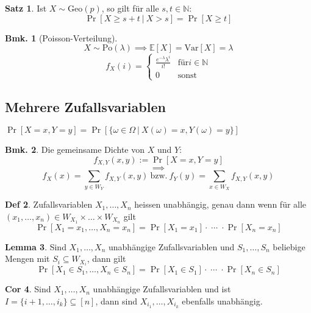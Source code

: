 \documentclass[a4paper, 10pt]{article}
\theoremstyle{definition}
\newtheorem{definition}{Def}[section]
\newtheorem{theorem}[definition]{Satz}
\newtheorem{nlemma}[definition]{Lemma}
\newtheorem{ncorollary}[definition]{Cor}
\newtheorem*{note}{Bmk.}
\theoremstyle{named}
\newcommand{\N}{\mathbb{N}}
\newcommand{\E}{\mathbb{E}}
\newcommand{\Var}{\text{Var}}
\begin{document}
\setcounter{definition}{44}
\begin{theorem}
    Ist $X \sim \text{Geo}(p)$, so gilt für alle $s, t \in \N$:
    $$\Pr[X \geq s + t \ | \ X > s] = \Pr[X \geq t]$$
\end{theorem}

\begin{note}[Poisson-Verteilung]
    $$X \sim \text{Po}(\lambda) \implies \E[X] = \Var[X] = \lambda$$
    $$f_X(i) = \begin{cases}
        \frac{e^{-\lambda} \lambda^i}{i!} & \text{für} i \in \N \\
        0 & \text{sonst}
    \end{cases}$$
\end{note}

\subsection{Mehrere Zufallsvariablen}
$\Pr[X = x, Y = y] = \Pr[\{\omega \in \Omega \ | \ X(\omega) = x, Y(\omega) = y\}]$

\begin{note}
    Die gemeinsame Dichte von $X$ und $Y$:
    $$f_{X, Y}(x, y) := \Pr[X = x, Y = y]$$
    $$\implies$$
    $$f_X(x) = \sum_{y \in W_Y} f_{X, Y}(x, y) \ \text{bzw.} \ f_Y(y) = \sum_{x \in W_X} f_{X, Y}(x, y)$$
\end{note}

\setcounter{definition}{51}
\begin{definition}
    Zufallsvariablen $X_1, \ldots, X_n$ heissen unabhängig, genau dann wenn für alle $(x_1, \ldots, x_n) \in W_{X_1} \times \ldots \times W_{X_n}$ gilt
    $$\Pr[X_1 = x_1, \ldots , X_n = x_n] = \Pr[X_1 = x_1] \cdot \; \cdots \; \cdot \Pr[X_n = x_n]$$
\end{definition}

\begin{nlemma}
    Sind $X_1, \ldots, X_n$ unabhängige Zufallsvariablen und $S_1, \ldots, S_n$ beliebige Mengen mit $S_i \subseteq W_{X_i}$, dann gilt
    $$\Pr[X_1 \in S_1, \ldots, X_n \in S_n] = \Pr[X_1 \in S_1] \cdot \; \cdots \; \cdot \Pr[X_n \in S_n]$$
\end{nlemma}

\begin{ncorollary}
    Sind $X_1, \ldots, X_n$ unabhängige Zufallsvariablen und ist $I = \{i+1, \ldots, i_k\} \subseteq [n]$, dann sind $X_{i_1}, \ldots, X_{i_k}$ ebenfalls unabhängig.
\end{ncorollary}
\end{document}
